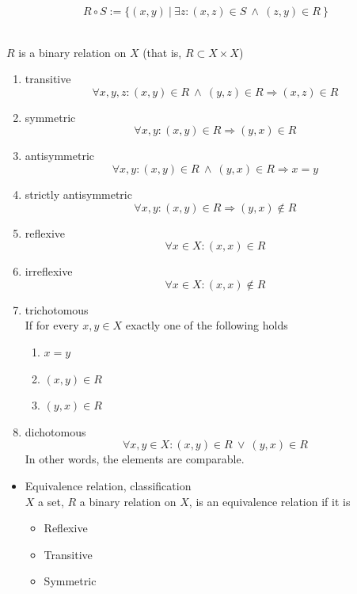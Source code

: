 \documentclass[margin=0px]{article}
\begin{document}
\begin{description}
\begin{itemize}
                  \[ R \circ S := \{ (x,y) \ | \ \exists z : (x,z) \in S \ \land \ (z,y) \in R \ \} \]
        \end{itemize}
    \item[Properties] \hfill \\
        $R$ is a binary relation on $X$ (that is, $R \subset X\times X$)
        \begin{enumerate}
            \item transitive \\
                  \[\forall x,y,z : (x,y)\in R \ \land \ (y,z) \in R \Longrightarrow (x,z) \in R \]
            \item symmetric \\
                  \[\forall x,y : (x,y)\in R \Longrightarrow (y,x) \in R \]
            \item antisymmetric \\
                  \[\forall x,y : (x,y)\in R \ \land \ (y,x) \in R \Longrightarrow x = y\]
            \item strictly antisymmetric \\
                  \[\forall x,y : (x,y)\in R \Longrightarrow (y,x) \notin R\]
            \item reflexive \\
                  \[\forall x \in X : (x,x)\in R\]
            \item irreflexive \\
                  \[\forall x \in X : (x,x)\notin R\]
            \item trichotomous \\
                  If for every $x,y \in X$ exactly one of the following holds
                  \begin{enumerate}
                      \item[a)] $x=y$
                      \item[b)] $(x,y) \in R$
                      \item[c)] $(y,x) \in R$
                  \end{enumerate}
            \item dichotomous \\
                  \[\forall x,y \in X : (x,y) \in R \ \lor \ (y,x) \in R\]
                  In other words, the elements are comparable.
        \end{enumerate}
    \item[Orderings] \hfill
        \begin{itemize}
            \item Equivalence relation, classification \\
                  $X$ a set, $R$ a binary relation on $X$, is an equivalence relation if it is
                  \begin{itemize}
                      \item Reflexive
                      \item Transitive
                      \item Symmetric
                  \end{itemize}


\end{itemize}
\end{description}
\end{document}
